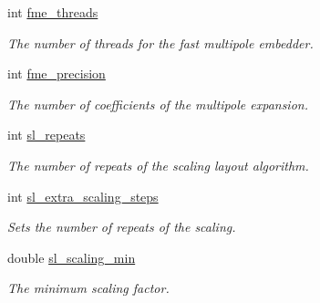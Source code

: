 \begin{DoxyCompactItemize}
\mbox{\label{structtmap_1_1LayoutConfiguration_a7630a7d7513c3f51ea00802a3f67ba92}} 
int \hyperlink{structtmap_1_1LayoutConfiguration_a7630a7d7513c3f51ea00802a3f67ba92}{fme\+\_\+threads}
\begin{DoxyCompactList}\small\item\em The number of threads for the fast multipole embedder. \end{DoxyCompactList}\item 
\mbox{\label{structtmap_1_1LayoutConfiguration_a9e4d43d8f65c21404cc9912c11a3eba7}} 
int \hyperlink{structtmap_1_1LayoutConfiguration_a9e4d43d8f65c21404cc9912c11a3eba7}{fme\+\_\+precision}
\begin{DoxyCompactList}\small\item\em The number of coefficients of the multipole expansion. \end{DoxyCompactList}\item 
\mbox{\label{structtmap_1_1LayoutConfiguration_adf81cfbcba521fd87a73dd25eb9c21e7}} 
int \hyperlink{structtmap_1_1LayoutConfiguration_adf81cfbcba521fd87a73dd25eb9c21e7}{sl\+\_\+repeats}
\begin{DoxyCompactList}\small\item\em The number of repeats of the scaling layout algorithm. \end{DoxyCompactList}\item 
\mbox{\label{structtmap_1_1LayoutConfiguration_aefd713cfba563ea8ee9a432c0359c440}} 
int \hyperlink{structtmap_1_1LayoutConfiguration_aefd713cfba563ea8ee9a432c0359c440}{sl\+\_\+extra\+\_\+scaling\+\_\+steps}
\begin{DoxyCompactList}\small\item\em Sets the number of repeats of the scaling. \end{DoxyCompactList}\item 
\mbox{\label{structtmap_1_1LayoutConfiguration_af2e01075c5fe2a36c6018b40a6919d7a}} 
double \hyperlink{structtmap_1_1LayoutConfiguration_af2e01075c5fe2a36c6018b40a6919d7a}{sl\+\_\+scaling\+\_\+min}
\begin{DoxyCompactList}\small\item\em The minimum scaling factor. \end{DoxyCompactList}\item 

\end{DoxyCompactItemize}
